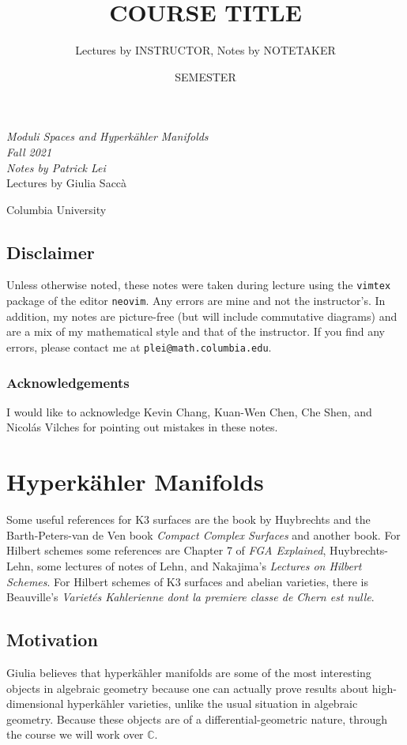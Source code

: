 \documentclass[leqno, openany]{memoir}
\title{COURSE TITLE}
\author{Lectures by INSTRUCTOR, Notes by NOTETAKER}
\date{SEMESTER}
\theoremstyle{definition}
\theoremstyle{remark}
\theoremstyle{plain}
\theoremstyle{definition}
\theoremstyle{remark}
\newcommand{\C}{\mathbb{C}}
\newcommand*{\titleSW}
    {\begingroup%
    \raggedleft
    \vspace*{\baselineskip}
    {\Huge\itshape Moduli Spaces and Hyperk\"ahler Manifolds  \\ Fall 2021}\\[\baselineskip]
    {\large\itshape Notes by Patrick Lei}\\[0.2\textheight]
    {\Large Lectures by Giulia Sacc\`a}\par
    \vfill
    {\Large \sffamily Columbia University}
    \vspace*{\baselineskip}
\endgroup}
\begin{document}
    
\begin{titlingpage}
\titleSW
\end{titlingpage}

\thispagestyle{empty}
\section*{Disclaimer}%
\label{sec:disclaimer}

Unless otherwise noted, these notes were taken during lecture using the
\texttt{vimtex} package of the editor \texttt{neovim}.  Any errors are mine and
not the instructor's.  In addition, my notes are picture-free (but will include
commutative diagrams) and are a mix of my mathematical style and that of the
instructor.  If you find any errors, please contact me at
\texttt{plei@math.columbia.edu}.

\subsection*{Acknowledgements}%
\label{sub:acknowledements}

I would like to acknowledge Kevin Chang, Kuan-Wen Chen, Che Shen, and Nicol\'as Vilches for pointing out mistakes in these notes.


\newpage

\tableofcontents

\chapter{Hyperk\"ahler Manifolds}%
\label{cha:introduction}

Some useful references for K3 surfaces are the book by Huybrechts and the Barth-Peters-van de Ven book \textit{Compact Complex Surfaces} and another book. For Hilbert schemes some references are Chapter 7 of \textit{FGA Explained}, Huybrechts-Lehn, some lectures of notes of Lehn, and Nakajima's \textit{Lectures on Hilbert Schemes}. For Hilbert schemes of K3 surfaces and abelian varieties, there is Beauville's \textit{Variet\'es Kahlerienne dont la premiere classe de Chern est nulle}. 

\section{Motivation}%
\label{sec:motivation}

Giulia believes that hyperk\"ahler manifolds are some of the most interesting objects in algebraic geometry because one can actually prove results about high-dimensional hyperk\"ahler varieties, unlike the usual situation in algebraic geometry. Because these objects are of a differential-geometric nature, through the course we will work over $\C$.
\end{document}
